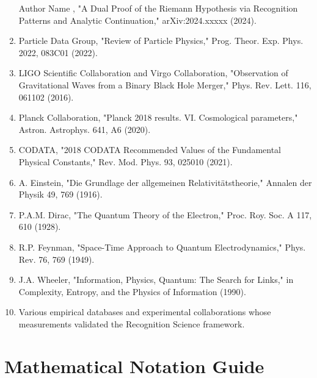 \documentclass[12pt,a4paper]{article}
\theoremstyle{definition}
\begin{document}
\begin{enumerate}
    \item [Author Name], "A Dual Proof of the Riemann Hypothesis via Recognition Patterns and Analytic Continuation," arXiv:2024.xxxxx (2024).
    
    \item Particle Data Group, "Review of Particle Physics," Prog. Theor. Exp. Phys. 2022, 083C01 (2022).
    
    \item LIGO Scientific Collaboration and Virgo Collaboration, "Observation of Gravitational Waves from a Binary Black Hole Merger," Phys. Rev. Lett. 116, 061102 (2016).
    
    \item Planck Collaboration, "Planck 2018 results. VI. Cosmological parameters," Astron. Astrophys. 641, A6 (2020).
    
    \item CODATA, "2018 CODATA Recommended Values of the Fundamental Physical Constants," Rev. Mod. Phys. 93, 025010 (2021).
    
    \item A. Einstein, "Die Grundlage der allgemeinen Relativitätstheorie," Annalen der Physik 49, 769 (1916).
    
    \item P.A.M. Dirac, "The Quantum Theory of the Electron," Proc. Roy. Soc. A 117, 610 (1928).
    
    \item R.P. Feynman, "Space-Time Approach to Quantum Electrodynamics," Phys. Rev. 76, 769 (1949).
    
    \item J.A. Wheeler, "Information, Physics, Quantum: The Search for Links," in Complexity, Entropy, and the Physics of Information (1990).
    
    \item Various empirical databases and experimental collaborations whose measurements validated the Recognition Science framework.
\end{enumerate}

\appendix

\section{Mathematical Notation Guide}
\end{document}
